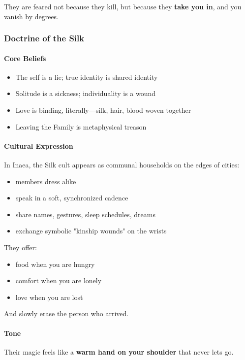 \documentclass[11pt]{book}
\begin{document}
They are feared not because they kill, but because they \textbf{take you in}, and you vanish by degrees.

\subsubsection{Doctrine of the Silk}

\paragraph{Core Beliefs}
\begin{itemize}[leftmargin=*]
    \item The self is a lie; true identity is shared identity  
    \item Solitude is a sickness; individuality is a wound  
    \item Love is binding, literally---silk, hair, blood woven together  
    \item Leaving the Family is metaphysical treason  
\end{itemize}

\paragraph{Cultural Expression}
In Inaea, the Silk cult appears as communal households on the edges of cities:
\begin{itemize}[leftmargin=*]
    \item members dress alike  
    \item speak in a soft, synchronized cadence  
    \item share names, gestures, sleep schedules, dreams  
    \item exchange symbolic "kinship wounds" on the wrists  
\end{itemize}

They offer:
\begin{itemize}[leftmargin=*]
    \item food when you are hungry  
    \item comfort when you are lonely  
    \item love when you are lost  
\end{itemize}

And slowly erase the person who arrived.

\paragraph{Tone}
Their magic feels like a \textbf{warm hand on your shoulder}  
that never lets go.
\end{document}
